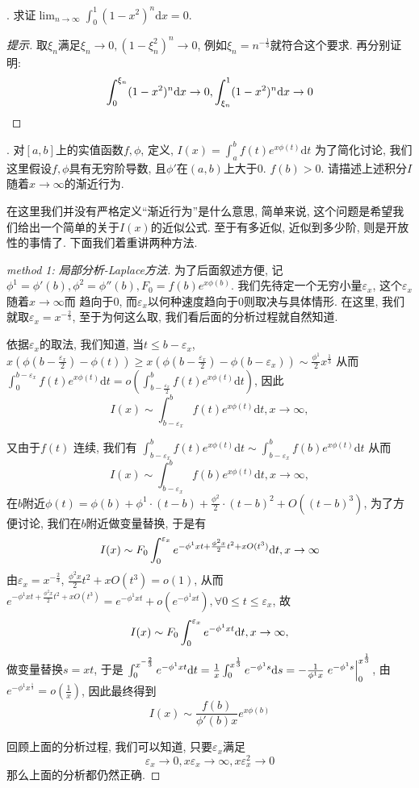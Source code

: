 \documentclass[a4paper,12pt]{article}
\begin{document}
. 求证$\lim_{n\to\infty}\int_0^1(1-x^2)^n\mathrm{d}x=0$.
  \begin{proof}[提示]
    取$\xi_n$满足$\xi_n\to0,(1-\xi_n^2)^n\to0$, 例如$\xi_n=n^{-\frac{1}{3}}$就符合这个要求. 再分别证明:
    \[\int_0^{\xi_n}(1-x^2)^n\mathrm{d} x\to0,\int_{\xi_n}^1(1-x^2)^n\mathrm{d} x\to0\]
  \end{proof}

. 对$[a,b]$上的实值函数$f,\phi$, 定义, 
    \(
    I(x)=\int_a^bf(t)e^{x\phi(t)}\mathrm{d}t
    \)
  为了简化讨论, 我们这里假设$f,\phi$具有无穷阶导数, 且$\phi'$在$(a,b)$上大于0. $f(b)>0$.
请描述上述积分$I$随着$x\to\infty$的渐近行为. 

  在这里我们并没有严格定义``渐近行为''是什么意思, 简单来说, 
  这个问题是希望我们给出一个简单的关于$I(x)$的近似公式. 
  至于有多近似, 近似到多少阶, 则是开放性的事情了. 
  下面我们着重讲两种方法.
  \begin{proof}[method 1: 局部分析-Laplace方法]
    为了后面叙述方便, 记$\phi^1=\phi'(b),\phi^2=\phi''(b),F_0=f(b)e^{x\phi(b)}$.
    我们先待定一个无穷小量$\varepsilon_x$, 这个$\varepsilon_x$随着$x\to\infty$而
    趋向于$0$, 而$\varepsilon_x$以何种速度趋向于$0$则取决与具体情形. 在这里,
    我们就取$\varepsilon_x=x^{-\frac{2}{3}}$, 
    至于为何这么取, 我们看后面的分析过程就自然知道.
    
    依据$\varepsilon_x$的取法, 我们知道, 当$t\leq b-\varepsilon_x$, 
    $x(\phi(b-\frac{\varepsilon_x}{2})-\phi(t))\geq
    x(\phi(b-\frac{\varepsilon_x}{2})-\phi(b-\varepsilon_x))
    \sim\frac{\phi^1}{2}x^{\frac{1}{3}}$
    从而$
    \int_{0}^{b-\varepsilon_x}f(t)e^{x\phi(t)}\mathrm{d}t
    =o(\int_{b-\frac{\varepsilon_x}{2}}^{b}f(t)e^{x\phi(t)}\mathrm{d}t)$, 因此
    \[
      I(x)\sim\int_{b-\varepsilon_x}^bf(t)e^{x\phi(t)}\mathrm{d}t,
      x\to\infty,
    \]

    又由于$f(t)$ 连续, 我们有
    $\int_{b-\varepsilon_x}^bf(t)e^{x\phi(t)}\mathrm{d}t \sim \int_{b-\varepsilon_x}^bf(b)e^{x\phi(t)}\mathrm{d}t$
    从而
    \[
      I(x)\sim\int_{b-\varepsilon_x}^bf(b)e^{x\phi(t)}\mathrm{d}t,
      x\to\infty,
      \]
    在$b$附近$\phi(t)=\phi(b)+\phi^1\cdot(t-b)+\frac{\phi^2}{2}\cdot(t-b)^2+O((t-b)^3)$,
    为了方便讨论, 我们在$b$附近做变量替换, 于是有
    \[
      I(x)\sim 
      F_0\int_0^{\varepsilon_x}e^{-\phi^1xt+\frac{\phi^2x}{2}t^2+xO(t^3)}\mathrm{d} t,x\to\infty
      \]
    由$\varepsilon_x=x^{-\frac{2}{3}}$, $\frac{\phi^2x}{2}t^2+xO(t^3)=o(1)$, 
    从而$e^{-\phi^1xt+\frac{\phi^2x}{2}t^2+xO(t^3)}=e^{-\phi^1xt}+o(e^{-\phi^1xt}),
    \forall 0\leq t\leq\varepsilon_x$, 故
    \[
      I(x)\sim F_0\int_0^{\varepsilon_x}e^{-\phi^1xt}\mathrm{d} t,
      x\to\infty,
      \]
    做变量替换$s=xt$, 于是
    $\int_0^{x^{-\frac{2}{3}}}e^{-\phi^1xt}\mathrm{d} t=
    \frac{1}{x}\int_0^{x^\frac{1}{3}}e^{-\phi^1s}\mathrm{d} s
    =-\frac{1}{\phi^1x}
    \left.e^{-\phi^1s}\right|_0^{x^\frac{1}{3}}$,
    由$e^{-\phi^1x^{\frac{1}{3}}}=o(\frac{1}{x})$, 
    因此最终得到
    \[I(x)\sim \frac{f(b)}{\phi'(b)x}e^{x\phi(b)}\]
    
    回顾上面的分析过程, 我们可以知道, 只要$\varepsilon_x$满足
    \[\varepsilon_x\to0,x\varepsilon_x\to\infty,x\varepsilon_x^2\to0\]
    那么上面的分析都仍然正确.
  \end{proof}
\end{document}

